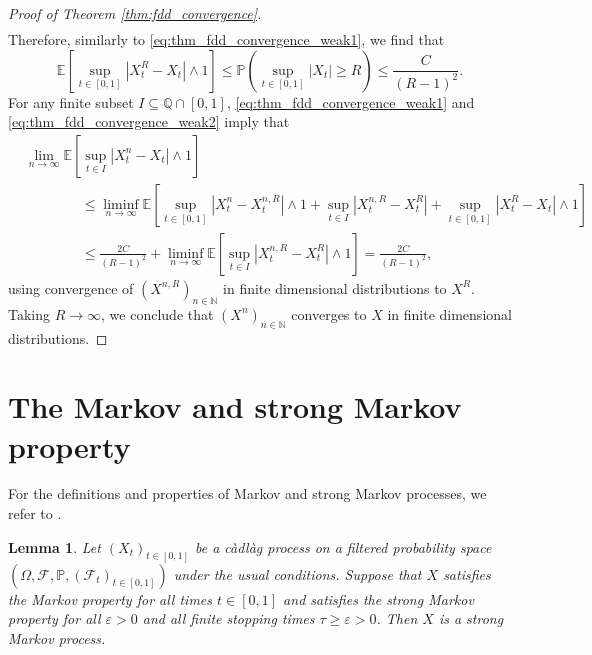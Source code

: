 \documentclass[12pt,oneside]{amsart}
\newtheorem{lemma}[theorem]{Lemma}
\theoremstyle{definition}
\newcommand{\F}{\mathcal F}
\newcommand{\N}{\mathbb N}
\def\P{{\mathbb P}}
\numberwithin{equation}{section}
\begin{document}
\begin{proof}[Proof of Theorem \ref{thm:fdd_convergence}]
\begin{align}
    \end{align}
    Therefore, similarly to \eqref{eq:thm_fdd_convergence_weak1}, we find that
    \begin{equation}
        \label{eq:thm_fdd_convergence_weak2}
        \mathbb E \!\left[ \sup_{t \in [0,1]} |X^R_t - X_t| \wedge 1 \right]\! \le \mathbb P\!\left( \sup_{t \in [0,1]} |X_t| \ge R \right)\! \le \frac{C}{(R - 1)^2}.    
    \end{equation}
    For any finite subset $I \subseteq \mathbb Q \cap [0,1]$, \eqref{eq:thm_fdd_convergence_weak1} and \eqref{eq:thm_fdd_convergence_weak2} imply that
    \begin{align}
        & \lim_{n \to \infty} \mathbb E\!\left[ \sup_{t \in I} |X_t^n - X_t| \wedge 1 \right]\! 
        \\
        & \qquad \qquad \le 
        \liminf_{n \to \infty} \mathbb E\!\left[ \sup_{t \in [0,1]} |X_t^n - X_t^{n,R}| \wedge 1 + \sup_{t \in I} |X_t^{n,R} - X_t^{R}| + \sup_{t \in [0,1]} |X_t^{R} - X_t| \wedge 1 \right]\!
        \\
        & \qquad \qquad \le
        \frac{2C}{(R-1)^2} + \liminf_{n \to \infty} \mathbb E \!\left[ \sup_{t \in I} |X_t^{n,R} - X_t^{R}| \wedge 1\right]\!
        =\frac{2C}{(R-1)^2},
    \end{align}
    using convergence of $(X^{n,R})_{n \in \N}$ in finite dimensional distributions to $X^R$. Taking $R \to \infty$, we conclude that $(X^n)_{n \in \N}$ converges to $X$ in finite dimensional distributions.
\end{proof}

\appendix

\section{The Markov and strong Markov property}\label{app:A}

For the definitions and properties of Markov and strong Markov processes, we refer to \cite{BlGe68,KaSh12}.

\begin{lemma}
    \label{lem:strong_Markov}
    Let $(X_t)_{t \in [0, 1]}$ be a c\`adl\`ag process on a filtered probability space $(\Omega, \F, \P, (\F_t)_{t\in [0,1]})$ under the usual conditions.
    Suppose that $X$ satisfies the Markov property for all times $t \in [0, 1]$ and satisfies the strong Markov property for all $\varepsilon > 0$ and all finite stopping times $\tau \ge \varepsilon > 0$. Then $X$ is a strong Markov process.
\end{lemma}
\end{document}

